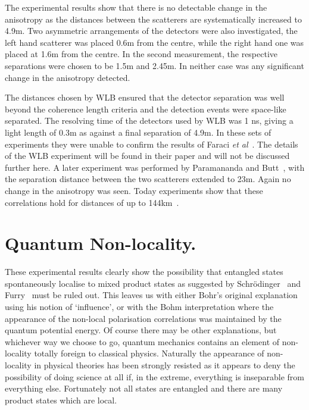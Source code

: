 \documentclass[11pt]{article}
\begin{document}
The experimental results show that there is no detectable change in the anisotropy as the  distances between the scatterers  are systematically increased to  4.9m.    Two asymmetric arrangements of the detectors were also investigated,  the left hand scatterer was placed  0.6m from the centre, while the right hand one was placed at 1.6m from the centre.  In the second measurement,  the respective separations were chosen to be 1.5m and 2.45m.
 In neither case was any significant change in the anisotropy detected.    
  
 The distances chosen by WLB ensured that the detector separation was well beyond the coherence length criteria and the detection events were space-like separated.  The resolving time of the detectors used by WLB was 1 ns, giving a light length of 0.3m as against a final separation of 4.9m.  In these sets of experiments they were unable to confirm the results of Faraci {\em et al}~\cite{dfdg74}. The details of the WLB experiment will be found in their paper and will not be discussed further here. 
A later experiment was performed by Paramananda and Butt~\cite{vpdb87}, with the separation distance between the two scatterers extended to 23m.  Again no change in the anisotropy was seen.  
Today experiments show that these correlations hold for distances of up to 144km~\cite{ruaa07}.

\section{Quantum Non-locality.}

These experimental results clearly show  the possibility that entangled states spontaneously localise to mixed product states as suggested by Schr\"{o}dinger~\cite{es35} and Furry~\cite{wf36} 
must be ruled out.  This leaves us with either Bohr's original explanation using his notion of `influence', or with the Bohm interpretation where the appearance of the non-local polarisation correlations was maintained by the quantum potential energy.  Of course there may be  other explanations, but whichever way we choose to go,  
quantum mechanics contains an element of non-locality totally foreign to classical physics. Naturally the appearance of non-locality in physical theories has been strongly resisted as it appears to deny the possibility of doing science at all if, in the extreme, everything is inseparable from everything else. Fortunately not all states are entangled and there are many product states which are local.
\end{document}
